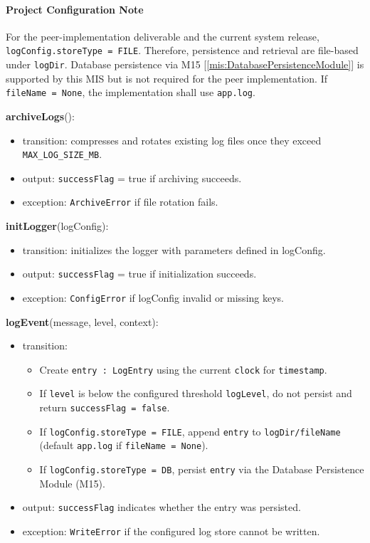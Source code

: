 \documentclass[12pt, titlepage]{article}
\begin{document}
\begin{itemize}
  \paragraph{Project Configuration Note}
  For the peer-implementation deliverable and the current system release,
  \texttt{logConfig.storeType = FILE}. Therefore, persistence and retrieval are file-based under
  \texttt{logDir}. Database persistence via M15 [\ref{mis:DatabasePersistenceModule}] is supported by this MIS but is not required for the peer implementation.
  If \texttt{fileName = None}, the implementation shall use \texttt{app.log}.



\noindent \textbf{archiveLogs}():
\begin{itemize}
  \item transition: compresses and rotates existing log files once they exceed \texttt{MAX\_LOG\_SIZE\_MB}.
  \item output: \texttt{successFlag} = true if archiving succeeds.
  \item exception: \texttt{ArchiveError} if file rotation fails.
\end{itemize}

  \noindent \textbf{initLogger}(logConfig):
  \begin{itemize}
    \item transition: initializes the logger with parameters defined in logConfig.
    \item output: \texttt{successFlag} = true if initialization succeeds.
    \item exception: \texttt{ConfigError} if logConfig invalid or missing keys.
  \end{itemize}

  \noindent \textbf{logEvent}(message, level, context):
  \begin{itemize}
    \item transition:
    \begin{itemize}
      \item Create \texttt{entry : LogEntry} using the current \texttt{clock} for \texttt{timestamp}.
      \item If \texttt{level} is below the configured threshold \texttt{logLevel}, do not persist and return \texttt{successFlag = false}.
      \item If \texttt{logConfig.storeType = FILE}, append \texttt{entry} to \texttt{logDir/fileName} (default \texttt{app.log} if \texttt{fileName = None}).
      \item If \texttt{logConfig.storeType = DB}, persist \texttt{entry} via the Database Persistence Module (M15).
    \end{itemize}
    \item output: \texttt{successFlag} indicates whether the entry was persisted.
    \item exception: \texttt{WriteError} if the configured log store cannot be written.
  \end{itemize}



\end{itemize}
\end{document}
